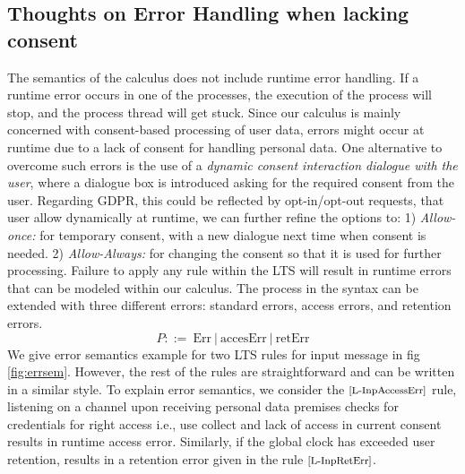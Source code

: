 \subsection{Thoughts on Error Handling when lacking consent }
The semantics of the calculus does not include runtime error handling. If a runtime error occurs in one of the processes, the execution of the process will stop, and the process thread will get stuck. Since our calculus is mainly concerned with consent-based processing of user data, errors might occur at runtime due to a lack of consent for handling personal data. One alternative to overcome such errors is the use of a \emph{dynamic consent interaction dialogue with the user}, where a dialogue box is introduced asking for the required consent from the user. Regarding GDPR, this could be reflected by opt-in/opt-out requests, that user allow dynamically at runtime, we can further refine the options to:
1) \emph{Allow-once:} for temporary consent, with a new dialogue next time when consent is needed. 
2) \emph{Allow-Always:} for changing the consent so that it is used for further processing. 
Failure to apply any rule within the LTS will result in runtime errors that can be modeled within our calculus. The process in the syntax can be extended with three different errors: standard errors, access errors, and retention errors. 
\vspace{-1mm}
     \[ P ::=    \ \text{Err}  \ | \ \text{accesErr}   \ | \ \text{retErr}  \]  
We give error semantics example for two LTS rules for input message in fig \ref{fig:errsem}. However, the rest of the rules are straightforward and can be written in a similar style. To explain error semantics, we consider the $ \scriptsize  \text{[L-InpAccessErr]}$ rule, listening on a  channel upon receiving personal data premises checks for credentials for right access i.e., use collect and lack of access in current consent results in runtime access error. Similarly, if the global clock has exceeded user retention, results in a retention error given in the rule  $ \scriptsize  \text{[L-InpRetErr]}$.


